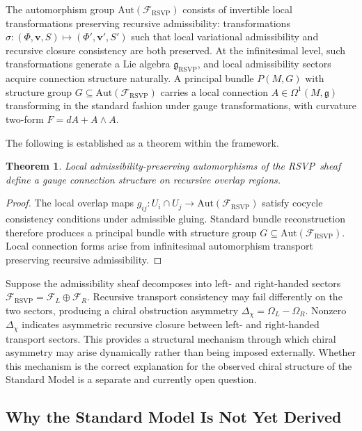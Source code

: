 \documentclass[12pt,a4paper]{article}
\newtheorem{theorem}[definition]{Theorem}
\newcommand{\RSVP}{\textrm{RSVP}}
\newcommand{\Sheaf}{\mathcal{F}}
\begin{document}
The automorphism group $\mathrm{Aut}(\Sheaf_\RSVP)$ consists of invertible
local transformations preserving recursive admissibility: transformations
$\sigma:(\Phi,\mathbf{v},S)\mapsto(\Phi',\mathbf{v}',S')$ such that local
variational admissibility and recursive closure consistency are both preserved.
At the infinitesimal level, such transformations generate a Lie algebra
$\mathfrak{g}_\RSVP$, and local admissibility sectors acquire connection
structure naturally. A principal bundle $P(M,G)$ with structure group
$G\subseteq\mathrm{Aut}(\Sheaf_\RSVP)$ carries a local connection
$A\in\Omega^1(M,\mathfrak{g})$ transforming in the standard fashion under
gauge transformations, with curvature two-form $F=dA+A\wedge A$.

The following is established as a theorem within the framework.

\begin{theorem}
Local admissibility-preserving automorphisms of the \RSVP\ sheaf define a gauge
connection structure on recursive overlap regions.
\end{theorem}

\begin{proof}
The local overlap maps $g_{ij}:U_i\cap U_j\to\mathrm{Aut}(\Sheaf_\RSVP)$
satisfy cocycle consistency conditions under admissible gluing. Standard bundle
reconstruction therefore produces a principal bundle with structure group
$G\subseteq\mathrm{Aut}(\Sheaf_\RSVP)$. Local connection forms arise from
infinitesimal automorphism transport preserving recursive admissibility.
\end{proof}

Suppose the admissibility sheaf decomposes into left- and right-handed sectors
$\Sheaf_\RSVP=\Sheaf_L\oplus\Sheaf_R$. Recursive transport consistency may
fail differently on the two sectors, producing a chiral obstruction asymmetry
$\Delta_\chi=\Omega_L-\Omega_R$. Nonzero $\Delta_\chi$ indicates asymmetric
recursive closure between left- and right-handed transport sectors. This
provides a structural mechanism through which chiral asymmetry may arise
dynamically rather than being imposed externally. Whether this mechanism is
the correct explanation for the observed chiral structure of the Standard Model
is a separate and currently open question.

\subsection{Why the Standard Model Is Not Yet Derived}
\end{document}
